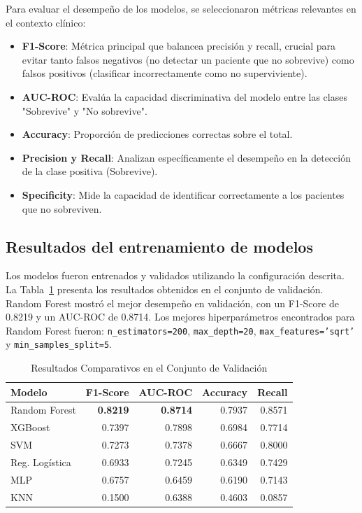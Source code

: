 \documentclass[journal]{IEEEtai}
\begin{document}
Para evaluar el desempeño de los modelos, se seleccionaron métricas relevantes en el contexto clínico:
\begin{itemize}
    \item \textbf{F1-Score}: Métrica principal que balancea precisión y recall, crucial para evitar tanto falsos negativos (no detectar un paciente que no sobrevive) como falsos positivos (clasificar incorrectamente como no superviviente).
    \item \textbf{AUC-ROC}: Evalúa la capacidad discriminativa del modelo entre las clases "Sobrevive" y "No sobrevive".
    \item \textbf{Accuracy}: Proporción de predicciones correctas sobre el total.
    \item \textbf{Precision y Recall}: Analizan específicamente el desempeño en la detección de la clase positiva (Sobrevive).
    \item \textbf{Specificity}: Mide la capacidad de identificar correctamente a los pacientes que no sobreviven.
\end{itemize}

\subsection{Resultados del entrenamiento de modelos}
Los modelos fueron entrenados y validados utilizando la configuración descrita. La Tabla~\ref{tab:val_results} presenta los resultados obtenidos en el conjunto de validación. Random Forest mostró el mejor desempeño en validación, con un F1-Score de 0.8219 y un AUC-ROC de 0.8714. Los mejores hiperparámetros encontrados para Random Forest fueron: \texttt{n\_estimators=200}, \texttt{max\_depth=20}, \texttt{max\_features='sqrt'} y \texttt{min\_samples\_split=5}.

\begin{table}[!ht]
\centering
\caption{Resultados Comparativos en el Conjunto de Validación}
\label{tab:val_results}
\begin{tabular}{lrrrr}
\toprule
\textbf{Modelo} & \textbf{F1-Score} & \textbf{AUC-ROC} & \textbf{Accuracy} & \textbf{Recall} \\
\midrule
Random Forest & \textbf{0.8219} & \textbf{0.8714} & 0.7937 & 0.8571 \\
XGBoost & 0.7397 & 0.7898 & 0.6984 & 0.7714 \\
SVM & 0.7273 & 0.7378 & 0.6667 & 0.8000 \\
Reg. Logística & 0.6933 & 0.7245 & 0.6349 & 0.7429 \\
MLP & 0.6757 & 0.6459 & 0.6190 & 0.7143 \\
KNN & 0.1500 & 0.6388 & 0.4603 & 0.0857 \\
\bottomrule
\end{tabular}
\end{table}
\end{document}
